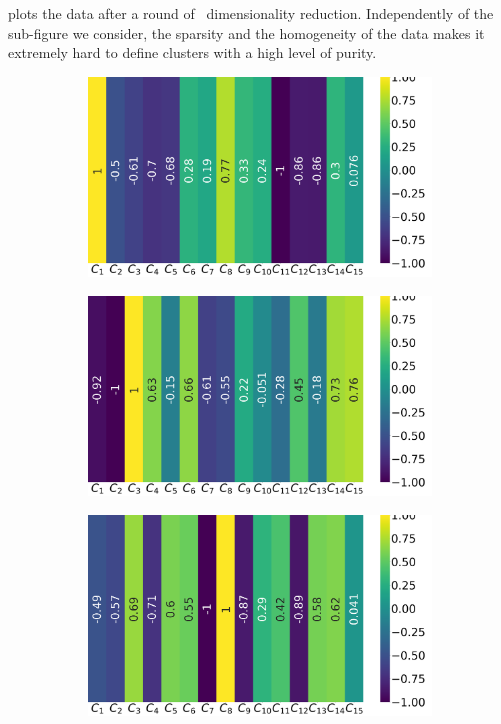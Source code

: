  plots the data after a round of \pca\ dimensionality reduction.
Independently of the sub-figure we consider, the sparsity and the homogeneity of the data makes it
extremely hard to define clusters with a high level of purity.
\begin{figure}[!ht]
	\centering
	\begin{subfigure}{0.49\linewidth}
		\includegraphics[width=\linewidth]{img/qlp_corr/Phi_coil0.png}
	\end{subfigure}
	\begin{subfigure}{0.49\linewidth}
		\includegraphics[width=\linewidth]{img/qlp_corr/Phi_coil1.png}
	\end{subfigure}
	\begin{subfigure}{0.49\linewidth}
		\includegraphics[width=\linewidth]{img/qlp_corr/Phi_coil2.png}

\end{subfigure}
\end{figure}
